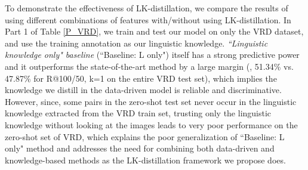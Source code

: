 To demonstrate the effectiveness of LK-distillation, we compare the results of using different combinations of features with/without using LK-distillation. In Part 1 of Table \ref{P_VRD}, we train and test our model on only the VRD dataset, and use the training annotation as our linguistic knowledge. 
\textit{``Linguistic knowledge only" baseline} (``Baseline: L only") itself has a strong predictive power and it outperforms the state-of-the-art method \cite{VRD} by a large margin (\eg, 51.34\%  vs. 47.87\% for R@100/50, k=1 on the entire VRD test set), which implies the knowledge we distill in the data-driven model is reliable and discriminative. 
However, since, some  pairs in the zero-shot test set never occur in the linguistic knowledge extracted from the VRD train set, trusting only the linguistic knowledge without looking at the images leads to very poor performance on the zero-shot set of VRD, which explains the poor generalization of ``Baseline: L only" method and addresses the need for combining both data-driven and knowledge-based methods as the LK-distillation framework we propose does.



